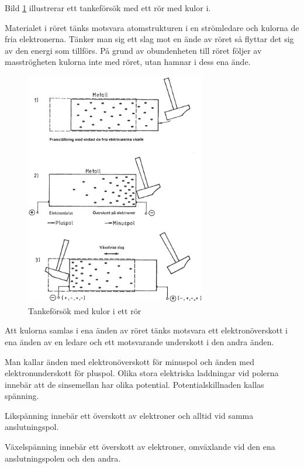 Bild \ref{fig:BildII1-2} illustrerar ett tankeförsök med ett rör med kulor i.

Materialet i röret tänks motsvara atomstrukturen i en strömledare och kulorna
de fria elektronerna.
Tänker man sig ett slag mot en ände av röret så flyttar det sig av den energi
som tillförs.
På grund av obundenheten till röret följer av masströgheten kulorna inte med
röret, utan hamnar i dess ena ände.

\begin{figure}
	\centering
	\includegraphics[width=0.7\textwidth]{images/cropped_pdfs/bild_2_1-02.pdf}
	\caption{Tankeförsök med kulor i ett rör}
	\label{fig:BildII1-2}
\end{figure}

Att kulorna samlas i ena änden av röret tänks motsvara ett elektronöverskott i
ena änden av en ledare och ett motsvarande underskott i den andra änden.

Man kallar änden med elektronöverskott för minuspol och änden med
elektronunderskott för pluspol.
Olika stora elektriska laddningar vid polerna innebär att de sinsemellan har
olika potential.
Potentialskillnaden kallas spänning.

Likspänning innebär ett överskott av elektroner och alltid vid samma
anslutningspol.

Växelspänning innebär ett överskott av elektroner, omväxlande vid den ena
anslutningspolen och den andra.

